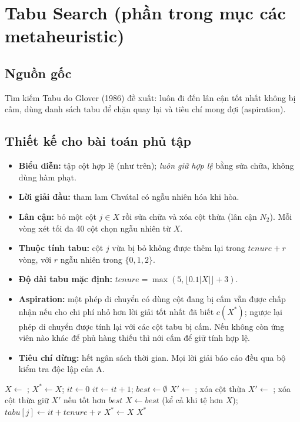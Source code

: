 \section{Tabu Search (phần trong mục các metaheuristic)}

\subsection{Nguồn gốc}
Tìm kiếm Tabu do Glover (1986) đề xuất: luôn đi đến lân cận tốt nhất không bị cấm, dùng danh sách tabu để chặn quay lại và tiêu chí mong đợi (aspiration).

\subsection{Thiết kế cho bài toán phủ tập}
\begin{itemize}
  \item \textbf{Biểu diễn:} tập cột hợp lệ (như trên); \emph{luôn giữ hợp lệ} bằng sửa chữa, không dùng hàm phạt.
  \item \textbf{Lời giải đầu:} tham lam Chvátal có ngẫu nhiên hóa khi hòa.
  \item \textbf{Lân cận:} bỏ một cột $j\in X$ rồi sửa chữa và xóa cột thừa (lân cận $N_2$). Mỗi vòng xét tối đa 40 cột chọn ngẫu nhiên từ $X$.
  \item \textbf{Thuộc tính tabu:} cột $j$ vừa bị bỏ không được thêm lại trong $tenure+r$ vòng, với $r$ ngẫu nhiên trong $\{0,1,2\}$.
  \item \textbf{Độ dài tabu mặc định:} $tenure=\max(5,\lfloor 0.1|X|\rfloor+3)$.
  \item \textbf{Aspiration:} một phép di chuyển có dùng cột đang bị cấm vẫn được chấp nhận nếu cho chi phí nhỏ hơn lời giải tốt nhất đã biết $c(X^*)$; ngược lại phép di chuyển được tính lại với các cột tabu bị cấm. Nếu không còn ứng viên nào khác để phủ hàng thiếu thì nới cấm để giữ tính hợp lệ.
  \item \textbf{Tiêu chí dừng:} hết ngân sách thời gian. Mọi lời giải báo cáo đều qua bộ kiểm tra độc lập của A.
\end{itemize}

\begin{algorithm}[htbp]
\caption{Tabu Search cho Set Cover}
\begin{algorithmic}[1]
\State $X\gets$ ; $X^*\gets X$; $it\gets 0$
  \State $it\gets it+1$; $best\gets\emptyset$
    \State $X'\gets$ ; xóa cột thừa
      \State $X'\gets$ ; xóa cột thừa
    \EndIf
    \State giữ $X'$ nếu tốt hơn $best$
  \EndFor
  \State $X\gets best$ (kể cả khi tệ hơn $X$); $tabu[j]\gets it+tenure+r$
   $X^*\gets X$ \EndIf
\EndWhile
\State \Return $X^*$
\end{algorithmic}
\end{algorithm}

